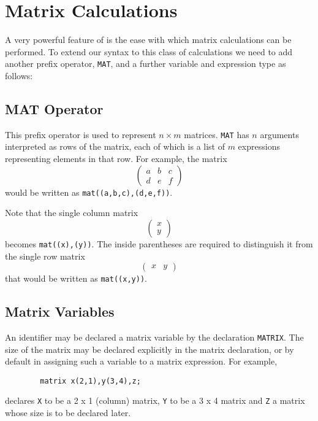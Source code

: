 \chapter{Matrix Calculations} 
A very powerful feature of {\REDUCE} is the ease with which matrix
calculations can be performed. To extend our syntax to this class of
calculations we need to add another prefix operator, \texttt{MAT},
 and a further
variable and expression type as follows:

\section{MAT Operator}
\hypertarget{operator:MAT}{}
This prefix operator is used to represent $n\times m$ matrices. \texttt{MAT} 
has $n$ arguments interpreted as rows of the matrix, each of
which is a list of $m$ expressions representing elements in that row.
For example, the matrix
\[ \left( \begin{array}{lcr} a & b & c \\ d & e & f \end{array} \right) \]
would be written as \texttt{mat((a,b,c),(d,e,f))}.

Note that the single column matrix
\[ \left( \begin{array}{c} x \\ y \end{array} \right) \]
becomes \texttt{mat((x),(y))}.  The inside parentheses are required to
distinguish it from the single row matrix
\[ \left( \begin{array}{lr} x & y \end{array} \right) \]
that would be written as \texttt{mat((x,y))}.

\section{Matrix Variables}
\label{sec:core-matrix-variables}
\hypertarget{command:MATRIX}{}

An identifier may be declared a matrix variable by the declaration 
\texttt{MATRIX}.
The size of the matrix may be declared explicitly in the matrix
declaration, or by default in assigning such a variable to a matrix
expression. For example,
\begin{verbatim}
        matrix x(2,1),y(3,4),z;
\end{verbatim}
declares \texttt{X} to be a 2 x 1 (column) matrix, \texttt{Y} to be a 3 x 4
matrix and \texttt{Z} a matrix whose size is to be declared later.


